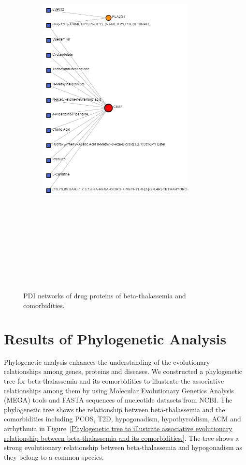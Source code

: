 \begin{figure}[H]
\begin{subfigure}[t]{0.48\textwidth}
        \includegraphics[height=20cm, width=8cm]{./fig/fig4_14_2.png}
        \label{fig:subnetwork2}
    \end{subfigure}
    \caption{PDI networks of drug proteins of beta-thalassemia and comorbidities.}
    \label{fig:figure4-14}
\end{figure}


\section{Results of Phylogenetic Analysis}
\label{sec:sec4_8}
Phylogenetic analysis enhances the understanding of the evolutionary relationships among genes, proteins and diseases. We constructed a phylogenetic tree for beta-thalassemia and its comorbidities to illustrate the associative relationships among them by using Molecular Evolutionary Genetics Analysis (MEGA) tools and FASTA sequences of nucleotide datasets from NCBI. The phylogenetic tree shows the relationship between beta-thalassemia and the comorbidities including PCOS, T2D, hypogonadism, hypothyroidism, ACM and arrhythmia in Figure~\ref{Phylogenetic tree to illustrate associative evolutionary relationship between beta-thalassemia and its comorbidities.}. The tree shows a strong evolutionary relationship between beta-thalassemia and hypogonadism as they belong to a common species.\\

